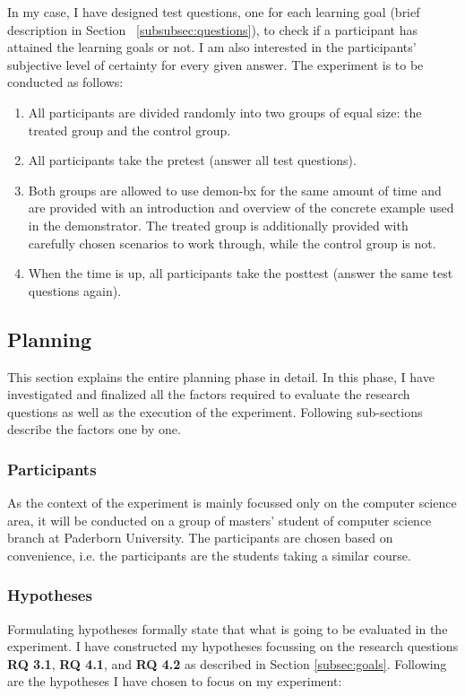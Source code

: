 In my case, I have designed test questions, one for each learning goal (brief description in Section~ \ref{subsubsec:questions}), to check if a participant has attained the learning goals or not. I am also interested in the participants' subjective level of certainty for every given answer. The experiment is to be conducted as follows:

\begin{enumerate}
	\item All participants are divided randomly into two groups of equal size: the treated group and the control group.
	\item All participants take the pretest (answer all test questions).
	\item Both groups are allowed to use demon-bx for the same amount of time and are provided with an introduction and overview of the concrete example used in the demonstrator.
	The treated group is additionally provided with carefully chosen scenarios to work through, while the control group is not.
	\item When the time is up, all participants take the posttest (answer the same test questions again).
\end{enumerate}

\subsection{Planning}\label{subsec:planning}
This section explains the entire planning phase in detail. In this phase, I have investigated and  finalized all the factors required to evaluate the research questions as well as the execution of the experiment. Following sub-sections describe the factors one by one.

\subsubsection{Participants}\label{subsubsec:participants}
As the context of the experiment is mainly focussed only on the computer science area, it will be conducted on a group of masters' student of computer science branch at Paderborn University. The participants are chosen based on convenience, i.e. the participants are the students taking a similar course.

\subsubsection{Hypotheses}\label{subsubsec:hypotheses}
Formulating hypotheses formally state that what is going to be evaluated in the experiment. I have constructed my hypotheses focussing on the research questions \textbf{RQ 3.1}, \textbf{RQ 4.1}, and  \textbf{RQ 4.2} as described in Section \ref{subsec:goals}. Following are the hypotheses I have chosen to focus on my experiment:\\

